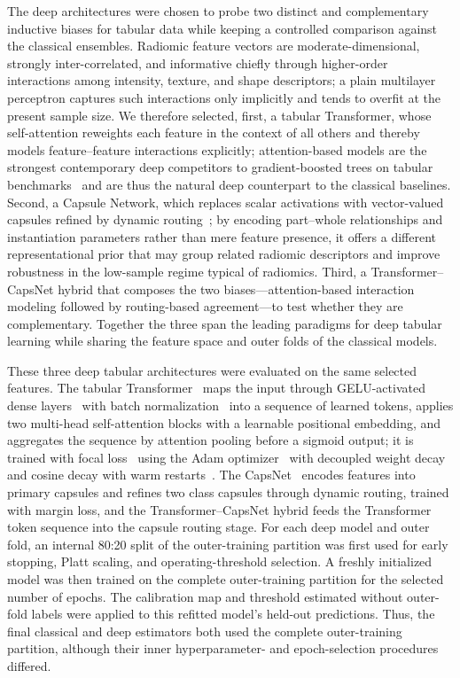 \documentclass[11pt]{article}
\begin{document}
The deep architectures were chosen to probe two distinct and complementary
inductive biases for tabular data while keeping a controlled comparison against
the classical ensembles. Radiomic feature vectors are moderate-dimensional,
strongly inter-correlated, and informative chiefly through higher-order
interactions among intensity, texture, and shape descriptors; a plain multilayer
perceptron captures such interactions only implicitly and tends to overfit at
the present sample size. We therefore selected, first, a tabular
Transformer, whose self-attention reweights each feature in the context of all
others and thereby models feature--feature interactions explicitly; attention-based
models are the strongest contemporary deep competitors to gradient-boosted trees
on tabular benchmarks~\citep{gorishniy2021revisiting,vaswani2017attention} and
are thus the natural deep counterpart to the classical baselines. Second, a
Capsule Network, which replaces scalar activations with vector-valued capsules
refined by dynamic routing~\citep{sabour2017dynamic}; by encoding part--whole
relationships and instantiation parameters rather than mere feature presence, it
offers a different representational prior that may group related radiomic
descriptors and improve robustness in the low-sample regime typical of
radiomics. Third, a Transformer--CapsNet hybrid that composes the two
biases---attention-based interaction modeling followed by routing-based
agreement---to test whether they are complementary. Together the three span the
leading paradigms for deep tabular learning while sharing the feature space and
outer folds of the classical models.

These three deep tabular architectures were evaluated on the same selected
features. The tabular
Transformer~\citep{gorishniy2021revisiting,vaswani2017attention} maps the input
through GELU-activated dense layers~\citep{hendrycks2016gaussian} with batch
normalization~\citep{ioffe2015batch} into a sequence of learned tokens, applies
two multi-head self-attention blocks with a learnable positional embedding, and
aggregates the sequence by attention pooling before a sigmoid output; it is
trained with focal loss~\citep{lin2017focal} using the Adam
optimizer~\citep{kingma2015adam} with decoupled weight decay and cosine decay
with warm restarts~\citep{loshchilov2017sgdr}. The
CapsNet~\citep{sabour2017dynamic} encodes features into primary capsules and
refines two class capsules through dynamic routing, trained with margin loss,
and the Transformer--CapsNet hybrid feeds the Transformer token sequence into the
capsule routing stage. For each deep model and outer fold, an internal 80:20
split of the outer-training partition was first used for early stopping, Platt
scaling, and operating-threshold selection. A freshly initialized model was then
trained on the complete outer-training partition for the selected number of
epochs. The calibration map and threshold estimated without outer-fold labels
were applied to this refitted model's held-out predictions. Thus, the final
classical and deep estimators both used the complete outer-training partition,
although their inner hyperparameter- and epoch-selection procedures differed.
\end{document}
